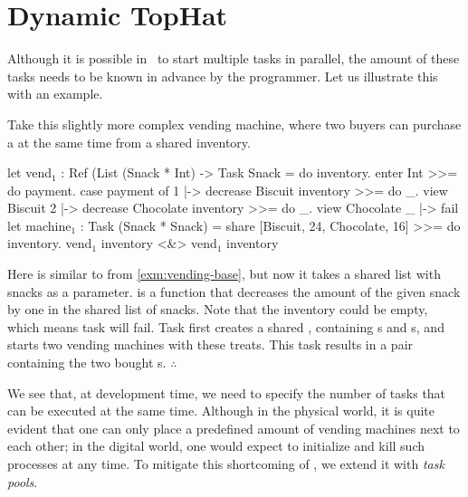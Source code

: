 
\section{Dynamic TopHat}
\label{sec:dyntophat}


Although it is possible in \TOPHAT\ to start multiple tasks in parallel,
the amount of these tasks needs to be known in advance by the programmer.
Let us illustrate this with an example.

\begin{example}
  \label{exm:vending-shared}
  Take this slightly more complex vending machine,
  where two buyers can purchase a  at the same time from a shared inventory.

  \begin{TASK}[emph={inventory,payment}]
    let vend$_1$ : Ref (List (Snack * Int) -> Task Snack =
      do inventory.
        enter Int >>= do payment.
        case payment of
          1 |-> decrease Biscuit inventory >>= do _.
               view Biscuit
          2 |-> decrease Chocolate inventory >>= do _.
               view Chocolate
          _ |-> fail
    let machine$_1$ : Task (Snack * Snack) =
      share [{Biscuit, 24}, {Chocolate, 16}] >>= do inventory.
      vend$_1$ inventory <&> vend$_1$ inventory
  \end{TASK}

  Here  is similar to  from \cref{exm:vending-base},
  but now it takes a shared list with snacks as a parameter.
   is a function that decreases the amount of the given snack by one in the shared list of snacks.
  Note that the inventory could be empty, which means task  will fail.
  Task  first creates a shared ,
  containing s and s,
  and starts two vending machines with these treats.
  This task results in a pair containing the two bought s.
\hfill$\therefore$\end{example}

We see that, at development time, we need to specify the number of  tasks that can be executed at the same time.
Although in the physical world, it is quite evident that one can only place a predefined amount of vending machines next to each other;
in the digital world, one would expect to initialize and kill such processes at any time.
To mitigate this shortcoming of \TOPHAT, we extend it with \emph{task pools}.


